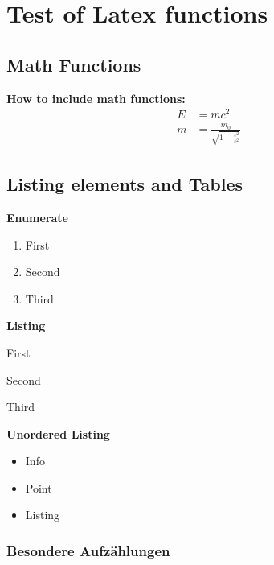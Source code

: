\chapter{Test of Latex functions}\label{app:test-of-latex-functions}

\section{Math Functions}
\textbf{How to include math functions:}
\begin{align}
    E & = mc^2                                 \\
    m & = \frac{m_0}{\sqrt{1-\frac{v^2}{c^2}}}
\end{align}

\section{Listing elements and Tables}

\textbf{Enumerate}
\begin{enumerate}
    \item First
    \item Second
    \item Third
\end{enumerate}

\textbf{Listing}
\begin{description}
    \item{First}
    \item{Second}
    \item{Third}
\end{description}

\textbf{Unordered Listing}
\begin{itemize}
    \item{Info}
    \item{Point}
    \item{Listing}
\end{itemize}

\subsection{Besondere Aufzählungen}

%

